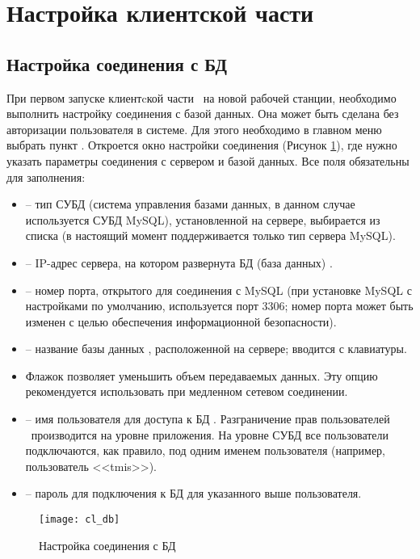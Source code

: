 \newpage
\section{Настройка клиентской части}

\subsection{Настройка соединения с БД}

При первом запуске клиентcкой части \tmis~на новой рабочей станции, необходимо выполнить настройку соединения с базой данных. Она может быть сделана без авторизации пользователя в системе. Для этого необходимо в главном меню выбрать пункт . Откроется окно настройки соединения (Рисунок \ref{img_cl_db}), где нужно указать параметры соединения с сервером и базой данных. Все поля обязательны для заполнения:
\begin{itemize}
 \item {} – тип СУБД (система управления базами данных, в данном случае используется СУБД MySQL), установленной на сервере, выбирается из списка (в настоящий момент поддерживается только тип сервера MySQL).
 \item {} – IP-адрес сервера, на котором развернута БД (база данных) \tmis.
 \item {} – номер порта, открытого для соединения с MySQL (при установке MySQL с настройками по умолчанию, используется порт 3306; номер порта может быть изменен с целью обеспечения информационной безопасности).
 \item {} – название базы данных \tmis, расположенной на сервере; вводится с клавиатуры.
 \item Флажок  позволяет уменьшить объем передаваемых данных. Эту опцию рекомендуется использовать при медленном сетевом соединении.
 \item {} – имя пользователя для доступа к БД  \tmis. Разграничение прав пользователей \tmis~производится на уровне приложения. На уровне СУБД все пользователи подключаются, как правило, под одним именем пользователя (например, пользователь <<tmis>>).
 \item {} – пароль для подключения к БД для указанного выше пользователя.
\end{itemize}

\begin{figure}[ht]\centering
 \texttt{[image: cl\_db]}
 \caption{Настройка соединения с БД}
 \label{img_cl_db}
\end{figure} 

